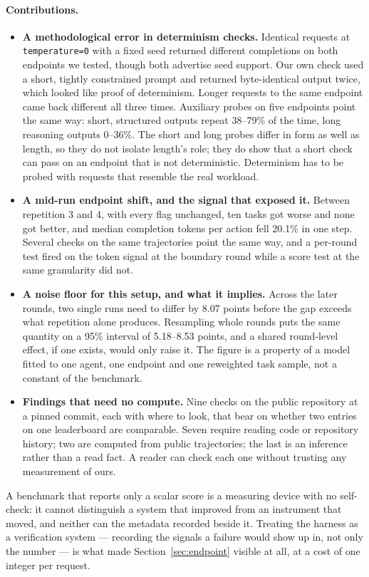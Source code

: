 \paragraph{Contributions.}
\begin{itemize}\itemsep2pt
\item \textbf{A methodological error in determinism checks.} Identical requests
  at \texttt{temperature{=}0} with a fixed seed returned different completions
  on both endpoints we tested, though both advertise seed support. Our own
  check used a short, tightly constrained prompt and returned byte-identical
  output twice, which looked like proof of determinism. Longer requests to the
  same endpoint came back different all three times. Auxiliary probes on five
  endpoints point the same way: short, structured outputs repeat 38--79\% of
  the time, long reasoning outputs 0--36\%. The short and long probes differ in
  form as well as length, so they do not isolate length's role; they do show
  that a short check can pass on an endpoint that is not deterministic.
  Determinism has to be probed with requests that resemble the real workload.
\item \textbf{A mid-run endpoint shift, and the signal that exposed it.}
  Between repetition 3 and 4, with every flag unchanged, ten tasks got worse
  and none got better, and median completion tokens per action fell 20.1\% in
  one step. Several checks on the same trajectories point the same way, and a
  per-round test fired on the token signal at the boundary round while a score
  test at the same granularity did not.
\item \textbf{A noise floor for this setup, and what it implies.} Across the
  later rounds, two single runs need to differ by 8.07 points before the gap
  exceeds what repetition alone produces. Resampling whole rounds puts the same
  quantity on a 95\% interval of 5.18--8.53 points, and a shared round-level
  effect, if one exists, would only raise it. The figure is a property of a
  model fitted to one agent, one endpoint and one reweighted task sample, not a
  constant of the benchmark.
\item \textbf{Findings that need no compute.} Nine checks on the public
  repository at a pinned commit, each with where to look, that bear on whether
  two entries on one leaderboard are comparable. Seven require reading code or
  repository history; two are computed from public trajectories; the last is an
  inference rather than a read fact. A reader can check each one without
  trusting any measurement of ours.
\end{itemize}

A benchmark that reports only a scalar score is a measuring device with no
self-check: it cannot distinguish a system that improved from an instrument
that moved, and neither can the metadata recorded beside it. Treating the
harness as a verification system --- recording the signals a failure would show
up in, not only the number --- is what made Section~\ref{sec:endpoint} visible
at all, at a cost of one integer per request.

